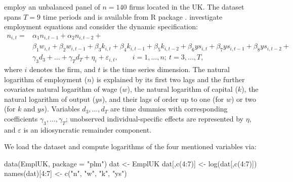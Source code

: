 \citet{AreBon1991} employ an unbalanced panel of $n=140$ firms located in the UK. The dataset spans $T=9$ time periods and is available from R package .
\citet{AreBon1991} investigate employment equations and consider the dynamic specification:
\begin{align} \label{EQ18:ABEstimation}
n_{i,t} =& \alpha_1 n_{i,t-1} + \alpha_2 n_{i,t-2} + \\
&\beta_1 w_{i,t} + \beta_2 w_{i,t-1} + \beta_3 k_{i,t} + \beta_4 k_{i,t-1} + \beta_5 k_{i,t-2} + \beta_6 ys_{i,t} + \beta_7 ys_{i,t-1} + \beta_8 ys_{i,t-2} + \nonumber \\
& \gamma_3 d_3 + \dots + \gamma_T d_T + \eta_i + \varepsilon_{i,t}, \qquad i = 1,...,n;\ t = 3,...,T, \nonumber
\end{align}
where $i$ denotes the firm, and $t$ is the time series dimension. The natural logarithm of employment ($n$) is explained by its first two lags and the further covariates natural logarithm of wage ($w$), the natural logarithm of capital ($k$), the natural logarithm of output ($ys$), and their lags of order up to one (for $w$) or two (for $k$ and $ys$). Variables $d_3, \dots, d_T$ are time dummies with corresponding coefficients $\gamma_3, \dots, \gamma_T$; unobserved individual-specific effects are represented by $\eta$, and $\varepsilon$ is an idiosyncratic remainder component.

We load the dataset and compute logarithms of the four mentioned variables via:
\begin{example}
data(EmplUK, package = "plm")
dat             <- EmplUK
dat[,c(4:7)]    <- log(dat[,c(4:7)])
names(dat)[4:7] <- c("n", "w", "k", "ys")
\end{example}


